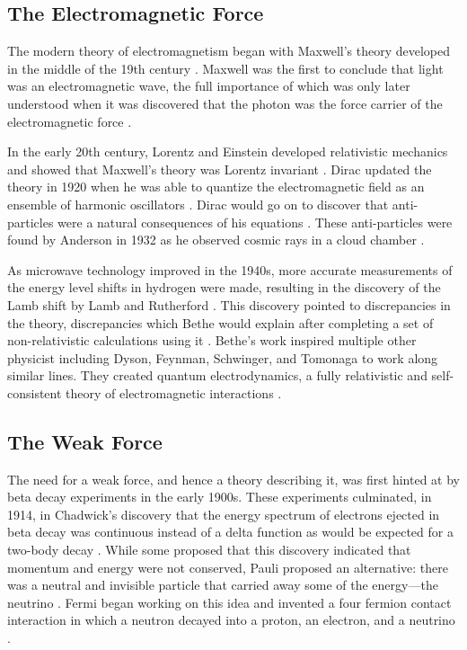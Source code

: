 \subsection{The Electromagnetic Force}
\label{subsection:electronmagnetic_force}

The modern theory of electromagnetism began with Maxwell's theory developed in
the middle of the 19th century \cite{maxwell1863}. Maxwell was the first to
conclude that light was an electromagnetic wave, the full importance of which
was only later understood when it was discovered that the photon was the force
carrier of the electromagnetic force \cite{maxwell1865}.

In the early 20th century, Lorentz and Einstein developed relativistic
mechanics and showed that Maxwell's theory was Lorentz invariant
\cite{lorentz1899}\cite{einstein1904}. Dirac updated the theory in 1920 when he
was able to quantize the electromagnetic field as an ensemble of harmonic
oscillators \cite{dirac1927}. Dirac would go on to discover that anti-particles
were a natural consequences of his equations \cite{dirac1928}\cite{dirac1930}.
These anti-particles were found by Anderson in 1932 as he observed cosmic rays
in a cloud chamber \cite{anderson1933}.

As microwave technology improved in the 1940s, more accurate measurements of
the energy level shifts in hydrogen were made, resulting in the discovery of
the Lamb shift by Lamb and Rutherford \cite{lamb1947}. This discovery pointed
to discrepancies in the theory, discrepancies which Bethe would explain after
completing a set of non-relativistic calculations using it \cite{bethe1947}.
Bethe's work inspired multiple other physicist including Dyson, Feynman,
Schwinger, and Tomonaga to work along similar lines. They created quantum
electrodynamics, a fully relativistic and self-consistent theory of
electromagnetic interactions
\cite{tomonaga1946}\cite{schwinger1948}\cite{feynman1949}\cite{dyson1949}.

\subsection{The Weak Force}
\label{subsection:weak_force}

The need for a weak force, and hence a theory describing it, was first hinted
at by beta decay experiments in the early 1900s. These experiments culminated,
in 1914, in Chadwick's discovery that the energy spectrum of electrons ejected
in beta decay was continuous instead of a delta function as would be expected
for a two-body decay \cite{chadwick1914}. While some proposed that this
discovery indicated that momentum and energy were not conserved, Pauli proposed
an alternative: there was a neutral and invisible particle that carried away
some of the energy---the neutrino \cite{pauli1930}. Fermi began working on this
idea and invented a four fermion contact interaction in which a neutron decayed
into a proton, an electron, and a neutrino \cite{fermi1934}.

